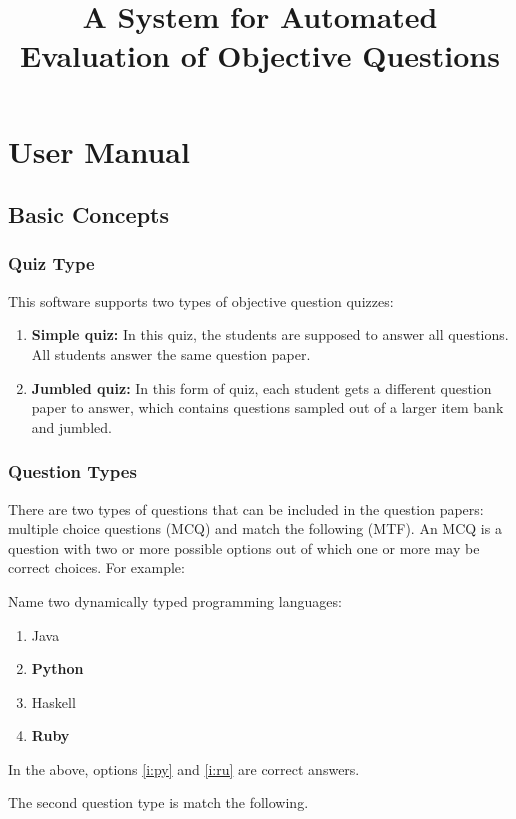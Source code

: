 \documentclass[12pt]{report}
\title{A System for Automated Evaluation of Objective Questions}
\begin{document}
\chapter{User Manual}

\section{Basic Concepts}
\subsection{Quiz Type}
This software supports two types of objective question quizzes:
\begin{enumerate}
\item \textbf{Simple quiz:} In this quiz, the students are supposed to answer all questions. All students answer the same question paper.
\item \textbf{Jumbled quiz:} In this form of quiz, each student gets a different question paper to answer, which contains questions sampled out of a larger item bank and jumbled.
\end{enumerate}

\subsection{Question Types}
There are two types of questions that can be included in the question papers: multiple choice questions (MCQ) and match the following (MTF).
An MCQ is a question with two or more possible options out of which one or more may be correct choices. For example:

\begin{mdframed}
Name two dynamically typed programming languages:

\begin{enumerate}
\item Java
\item \label{i:py} \textbf{Python}
\item Haskell
\item \label{i:ru} \textbf{Ruby}
\end{enumerate}
\end{mdframed}

In the above, options \ref{i:py} and \ref{i:ru} are correct answers.

The second question type is match the following.
\end{document}
